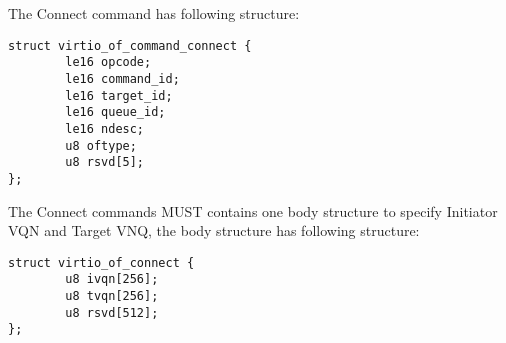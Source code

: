 The Connect command has following structure:

\begin{lstlisting}
struct virtio_of_command_connect {
        le16 opcode;
        le16 command_id;
        le16 target_id;
        le16 queue_id;
        le16 ndesc;
        u8 oftype;
        u8 rsvd[5];
};
\end{lstlisting}

The Connect commands MUST contains one body structure to specify Initiator VQN and Target VNQ, the body structure has following structure:

\begin{lstlisting}
struct virtio_of_connect {
        u8 ivqn[256];
        u8 tvqn[256];
        u8 rsvd[512];
};
\end{lstlisting}

\begin{lstlisting}
\end{lstlisting}
